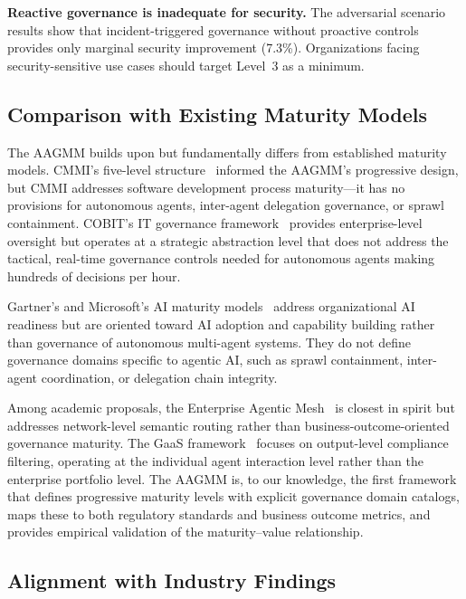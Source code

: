 \documentclass[ai,article,submit,pdftex,moreauthors]{Definitions/mdpi}
\begin{document}
\textbf{Reactive governance is inadequate for security.} The adversarial scenario results show that incident-triggered governance without proactive controls provides only marginal security improvement (7.3\%). Organizations facing security-sensitive use cases should target Level~3 as a minimum.

\subsection{Comparison with Existing Maturity Models}\label{sec:disc-comparison}

The AAGMM builds upon but fundamentally differs from established maturity models. CMMI's five-level structure~\cite{cmmi2018} informed the AAGMM's progressive design, but CMMI addresses software development process maturity---it has no provisions for autonomous agents, inter-agent delegation governance, or sprawl containment. COBIT's IT governance framework~\cite{cobit2019} provides enterprise-level oversight but operates at a strategic abstraction level that does not address the tactical, real-time governance controls needed for autonomous agents making hundreds of decisions per hour.

Gartner's and Microsoft's AI maturity models~\cite{gartner2024aimaturity,microsoft2024aimaturity} address organizational AI readiness but are oriented toward AI adoption and capability building rather than governance of autonomous multi-agent systems. They do not define governance domains specific to agentic AI, such as sprawl containment, inter-agent coordination, or delegation chain integrity.

Among academic proposals, the Enterprise Agentic Mesh~\cite{gupta2025eam} is closest in spirit but addresses network-level semantic routing rather than business-outcome-oriented governance maturity. The GaaS framework~\cite{fernandez2025gaas} focuses on output-level compliance filtering, operating at the individual agent interaction level rather than the enterprise portfolio level. The AAGMM is, to our knowledge, the first framework that defines progressive maturity levels with explicit governance domain catalogs, maps these to both regulatory standards and business outcome metrics, and provides empirical validation of the maturity--value relationship.

\subsection{Alignment with Industry Findings}\label{sec:disc-alignment}
\end{document}
